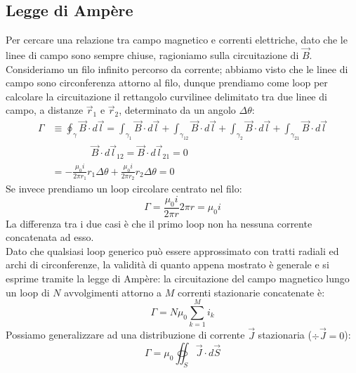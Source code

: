 \documentclass[]{article}
\begin{document}
\subsection{Legge di Ampère}

Per cercare una relazione tra campo magnetico e correnti elettriche, dato che le linee di campo sono sempre chiuse, ragioniamo sulla circuitazione di $ \vec{B} $. \\ 
%
Consideriamo un filo infinito percorso da corrente; abbiamo visto che le linee di campo sono circonferenza attorno al filo, dunque prendiamo come loop per calcolare la circuitazione il rettangolo curvilinee delimitato tra due linee di campo, a distanze $ \vec{r}_1 $ e $ \vec{r}_2 $, determinato da un angolo $ \Delta\theta $:
\begin{equation}
	\begin{split}
		\Gamma &\equiv \oint_{\gamma} \vec{B} \cdot d\vec{l} = \int_{\gamma_1} \vec{B} \cdot d\vec{l} + \int_{\gamma_{12}} \vec{B} \cdot d\vec{l} + \int_{\gamma_2} \vec{B} \cdot d\vec{l} + \int_{\gamma_{21}} \vec{B} \cdot d\vec{l} \\ 
		       & \qquad\qquad \vec{B}\cdot d\vec{l}_{12} = \vec{B}\cdot d\vec{l}_{21} = 0 \\ 
		       &= - \displaystyle\frac{\mu_0 i}{2\pi r_1} r_1 \Delta\theta + \displaystyle\frac{\mu_0 i}{2\pi r_2} r_2 \Delta\theta = 0
	\end{split}
	\label{eq:circ-1-filo-inf}
\end{equation}
Se invece prendiamo un loop circolare centrato nel filo:
\begin{equation}
	\Gamma = \displaystyle\frac{\mu_0 i}{2\pi r} 2\pi r = \mu_0 i
	\label{eq:circ-2-filo-inf}
\end{equation}
La differenza tra i due casi è che il primo loop non ha nessuna corrente concatenata ad esso. \\ 
%
Dato che qualsiasi loop generico può essere approssimato con tratti radiali ed archi di circonferenze, la validità di quanto appena mostrato è generale e si esprime tramite la legge di Ampère: la circuitazione del campo magnetico lungo un loop di $ N $ avvolgimenti attorno a $ M $ correnti stazionarie concatenate è:
\begin{equation}
	\Gamma = N \mu_0 \displaystyle\sum_{k = 1}^{M} i_k
	\label{eq:ampere}
\end{equation}
Possiamo generalizzare ad una distribuzione di corrente $ \vec{J} $ stazionaria ($ \div\vec{J} = 0 $):
\begin{equation}
	\Gamma = \mu_0 \oiint_S \vec{J} \cdot d\vec{S}
	\label{eq:ampere-int}
\end{equation}
\end{document}
